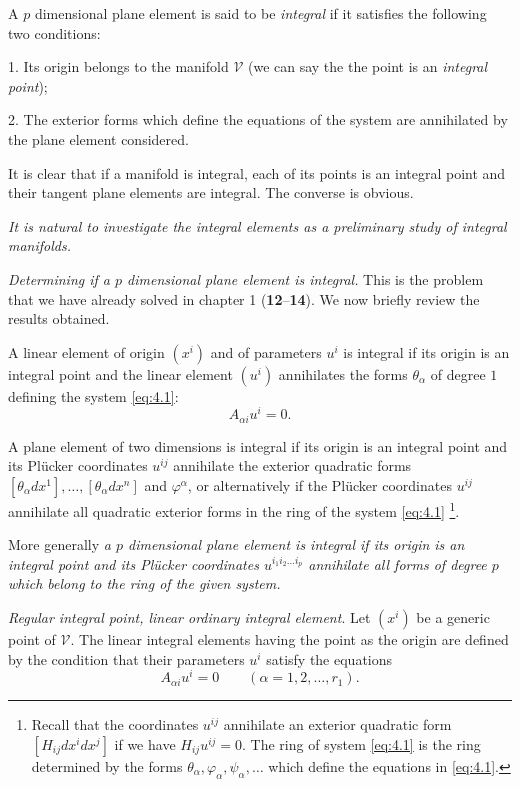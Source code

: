 A $p$ dimensional plane element is said to be \emph{integral} if it satisfies the following two conditions:

1. Its origin belongs to the manifold $\mathcal{V}$ (we can say the the point is an \emph{integral point});

2. The exterior forms which define the equations of the system are annihilated by the plane element considered.

It is clear that if a manifold is integral, each of its points is an integral point and their tangent plane elements are integral. The converse is obvious.

\emph{It is natural to investigate the integral elements as a preliminary study of integral manifolds.}

\vspace{12pt}\fsec \emph{Determining if a $p$ dimensional plane element is integral.} This is the problem that we have already solved in chapter 1 (\textsection\textbf{12}--\textbf{14}). We now briefly review the results obtained.

A linear element of origin $(x^{i})$ and of parameters $u^{i}$ is integral if its origin is an integral point and the linear element $(u^{i})$ annihilates the forms $\theta_{\alpha}$ of degree $1$ defining the system \eqref{eq:4.1}:
\[
A_{\alpha i}u^{i}=0.
\]

A plane element of two dimensions is integral if its origin is an integral point and its Pl\"ucker coordinates $u^{ij}$ annihilate the exterior quadratic forms $[\theta_{\alpha}dx^{1}],\dots,[\theta_{\alpha}dx^{n}]$ and $\varphi^{\alpha}$, or alternatively if the Pl\"ucker coordinates $u^{ij}$ annihilate all quadratic exterior forms in the ring of the system \eqref{eq:4.1} \footnote{Recall that the coordinates $u^{ij}$ annihilate an exterior quadratic form $[H_{ij}dx^{i}dx^{j}]$ if we have $H_{ij}u^{ij}=0$. The ring of system \eqref{eq:4.1} is the ring determined by the forms $\theta_{\alpha},\varphi_{\alpha},\psi_{\alpha},\dots$ which define the equations in \eqref{eq:4.1}.}.

More generally \emph{a $p$ dimensional plane element is integral if its origin is an integral point and its Pl\"ucker coordinates $u^{i_{1}i_{2}\dots i_{p}}$ annihilate all forms of degree $p$ which belong to the ring of the given system.}


\vspace{12pt}\fsec \emph{Regular integral point, linear ordinary integral element}. Let $(x^{i})$ be a generic point of $\mathcal{V}$. The linear integral elements having the point as the origin are defined by the condition that their parameters $u^{i}$ satisfy the equations
\begin{equation}
  \label{eq:4.2}
  A_{\alpha i}u^{i}=0\qquad(\alpha=1,2,\dots,r_{1}).
\end{equation}

